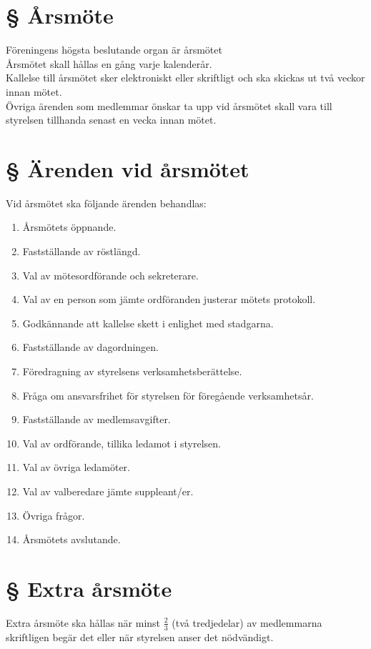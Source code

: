 \documentclass{article}
\begin{document}
\section{§ Årsmöte}
Föreningens högsta beslutande organ är årsmötet\\
Årsmötet skall hållas en gång varje kalenderår.\\
Kallelse till årsmötet sker elektroniskt eller skriftligt och ska skickas ut två veckor innan mötet.\\
Övriga ärenden som medlemmar önskar ta upp vid årsmötet skall vara till styrelsen tillhanda senast en vecka innan mötet.
\section{§ Ärenden vid årsmötet}
Vid årsmötet ska följande ärenden behandlas:
\begin{enumerate}
  \item Årsmötets öppnande.
  \item Fastställande av röstlängd.
  \item Val av mötesordförande och sekreterare.
  \item Val av en person som jämte ordföranden justerar mötets protokoll.
  \item Godkännande att kallelse skett i enlighet med stadgarna.
  \item Fastställande av dagordningen.
  \item Föredragning av styrelsens verksamhetsberättelse.
  \item Fråga om ansvarsfrihet för styrelsen för föregående verksamhetsår.
  \item Fastställande av medlemsavgifter.
  \item Val av ordförande, tillika ledamot i styrelsen.
  \item Val av övriga ledamöter.
  \item Val av valberedare jämte suppleant/er.
  \item Övriga frågor.
  \item Årsmötets avslutande.
\end{enumerate}
\section{§ Extra årsmöte}
Extra årsmöte ska hållas när minst $\frac{2}{3}$ (två tredjedelar) av medlemmarna skriftligen begär det eller när styrelsen anser det nödvändigt.
\end{document}
